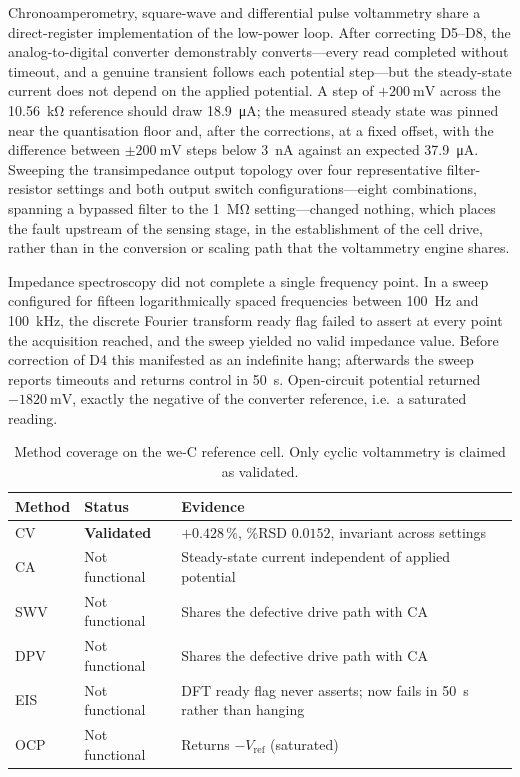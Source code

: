 Chronoamperometry, square-wave and differential pulse voltammetry share a
direct-register implementation of the low-power loop. After correcting D5--D8,
the analog-to-digital converter demonstrably converts---every read completed
without timeout, and a genuine transient follows each potential step---but the
steady-state current does not depend on the applied potential. A step of
$+\SI{200}{\milli\volt}$ across the \SI{10.56}{\kilo\ohm} reference should draw
\SI{18.9}{\micro\ampere}; the measured steady state was pinned near the
quantisation floor and, after the corrections, at a fixed offset, with the
difference between $\pm\SI{200}{\milli\volt}$ steps below \SI{3}{\nano\ampere}
against an expected \SI{37.9}{\micro\ampere}. Sweeping the transimpedance output
topology over four representative filter-resistor settings and both output
switch configurations---eight combinations, spanning a bypassed filter to the
\SI{1}{\mega\ohm} setting---changed nothing, which places the fault upstream of
the sensing stage, in the
establishment of the cell drive, rather than in the conversion or scaling path
that the voltammetry engine shares.

Impedance spectroscopy did not complete a single frequency point. In a sweep
configured for fifteen logarithmically spaced frequencies between
\SI{100}{\hertz} and \SI{100}{\kilo\hertz}, the discrete Fourier transform ready
flag failed to assert at every point the acquisition reached, and the sweep
yielded no valid impedance value. Before correction
of D4 this manifested as an indefinite hang; afterwards the sweep reports
timeouts and returns control in \SI{50}{\second}. Open-circuit potential
returned $-\SI{1820}{\milli\volt}$, exactly the negative of the converter
reference, i.e.\ a saturated reading.

\begin{table}[!t]
\caption{Method coverage on the we-C reference cell. Only cyclic voltammetry is
claimed as validated.}
\label{tab:coverage}
\centering
\footnotesize
\begin{tabular}{l l >{\raggedright\arraybackslash}p{3.6cm}}
\toprule
\textbf{Method} & \textbf{Status} & \textbf{Evidence} \\
\midrule
CV  & \textbf{Validated} & $+0.428\,\%$, \%RSD $0.0152$, invariant across settings \\
CA  & Not functional & Steady-state current independent of applied potential \\
SWV & Not functional & Shares the defective drive path with CA \\
DPV & Not functional & Shares the defective drive path with CA \\
EIS & Not functional & DFT ready flag never asserts; now fails in \SI{50}{\second} rather than hanging \\
OCP & Not functional & Returns $-V_{\mathrm{ref}}$ (saturated) \\
\bottomrule
\end{tabular}
\end{table}
